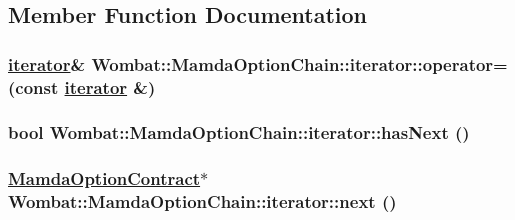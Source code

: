 \subsection{Member Function Documentation}
\hypertarget{classWombat_1_1MamdaOptionChain_1_1iterator_ff4ee79899630cdb20018924bd01a2af}{
\subsubsection[operator=]{\setlength{\rightskip}{0pt plus 5cm}\hyperlink{classWombat_1_1MamdaOptionChain_1_1iterator}{iterator}\& Wombat::Mamda\-Option\-Chain::iterator::operator= (const \hyperlink{classWombat_1_1MamdaOptionChain_1_1iterator}{iterator} \&)}}
\label{classWombat_1_1MamdaOptionChain_1_1iterator_ff4ee79899630cdb20018924bd01a2af}


\hypertarget{classWombat_1_1MamdaOptionChain_1_1iterator_2b7d07e58b4f3b0134d57483388f106c}{
\subsubsection[hasNext]{\setlength{\rightskip}{0pt plus 5cm}bool Wombat::Mamda\-Option\-Chain::iterator::has\-Next ()}}
\label{classWombat_1_1MamdaOptionChain_1_1iterator_2b7d07e58b4f3b0134d57483388f106c}


\hypertarget{classWombat_1_1MamdaOptionChain_1_1iterator_ca4efaeb0cd56b2ec22bcc8288e78a81}{
\subsubsection[next]{\setlength{\rightskip}{0pt plus 5cm}\hyperlink{classWombat_1_1MamdaOptionContract}{Mamda\-Option\-Contract}$\ast$ Wombat::Mamda\-Option\-Chain::iterator::next ()}}
\label{classWombat_1_1MamdaOptionChain_1_1iterator_ca4efaeb0cd56b2ec22bcc8288e78a81}




